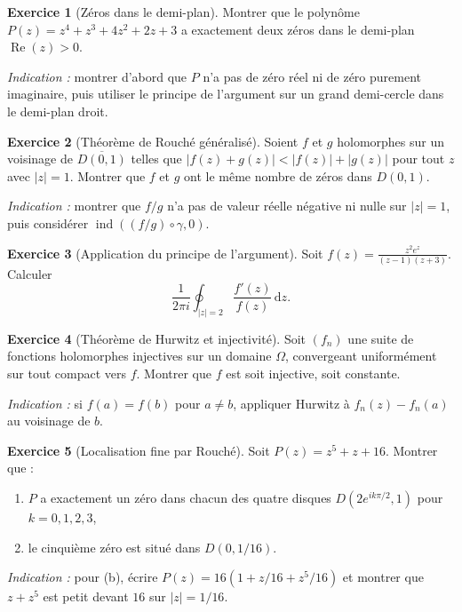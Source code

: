 \documentclass[12pt,a4paper,openany]{book}
\theoremstyle{definition}
\newtheorem{exercice}{Exercice}[chapter]
\theoremstyle{plain}
\theoremstyle{remark}
\DeclareMathOperator{\re}{Re}
\DeclareMathOperator{\ind}{ind}
\newcommand{\dd}{\mathrm{d}}
\newcommand{\abs}[1]{\left|#1\right|}
\begin{document}
\begin{exercice}[Zéros dans le demi-plan]\label{exo:zeros-demi-plan}
Montrer que le polynôme $P(z) = z^4 + z^3 + 4z^2 + 2z + 3$ a exactement deux
zéros dans le demi-plan $\re(z) > 0$.

\textit{Indication :} montrer d'abord que $P$ n'a pas de zéro réel ni de zéro
purement imaginaire, puis utiliser le principe de l'argument sur un
grand demi-cercle dans le demi-plan droit.
\end{exercice}

\begin{exercice}[Théorème de Rouché généralisé]\label{exo:rouche-generalise}
Soient $f$ et $g$ holomorphes sur un voisinage de $\overline{D(0,1)}$ telles que
$\abs{f(z) + g(z)} < \abs{f(z)} + \abs{g(z)}$ pour tout $z$ avec $\abs{z} = 1$.
Montrer que $f$ et $g$ ont le même nombre de zéros dans $D(0,1)$.

\textit{Indication :} montrer que $f/g$ n'a pas de valeur réelle négative ni
nulle sur $\abs{z} = 1$, puis considérer $\ind((f/g) \circ \gamma, 0)$.
\end{exercice}

\begin{exercice}[Application du principe de l'argument]\label{exo:principe-arg-calcul}
Soit $f(z) = \frac{z^2 e^z}{(z-1)(z+3)}$. Calculer
\[
  \frac{1}{2\pi i} \oint_{\abs{z}=2} \frac{f'(z)}{f(z)} \, \dd z.
\]
\end{exercice}

\begin{exercice}[Théorème de Hurwitz et injectivité]\label{exo:hurwitz-injectivite}
Soit $(f_n)$ une suite de fonctions holomorphes injectives sur un domaine
$\Omega$, convergeant uniformément sur tout compact vers $f$. Montrer que $f$
est soit injective, soit constante.

\textit{Indication :} si $f(a) = f(b)$ pour $a \neq b$, appliquer Hurwitz
à $f_n(z) - f_n(a)$ au voisinage de $b$.
\end{exercice}

\begin{exercice}[Localisation fine par Rouché]\label{exo:rouche-fine}
Soit $P(z) = z^5 + z + 16$. Montrer que :
\begin{enumerate}[label=(\alph*)]
  \item $P$ a exactement un zéro dans chacun des quatre disques
    $D(2e^{ik\pi/2}, 1)$ pour $k = 0, 1, 2, 3$,
  \item le cinquième zéro est situé dans $D(0, 1/16)$.
\end{enumerate}
\textit{Indication :} pour (b), écrire $P(z) = 16(1 + z/16 + z^5/16)$ et
montrer que $z + z^5$ est petit devant $16$ sur $\abs{z} = 1/16$.
\end{exercice}
\end{document}
